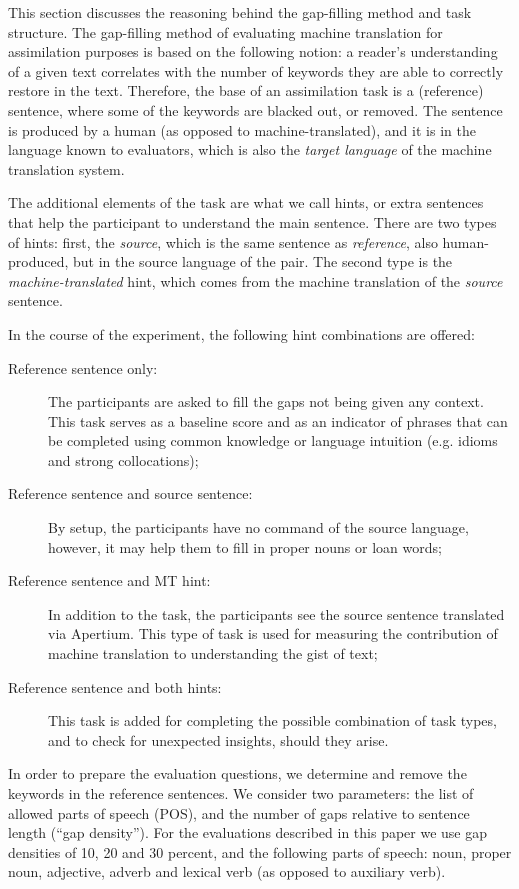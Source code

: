 \documentclass[11pt]{article}
\newcommand{\comment}[1]{\marginpar{\scriptsize\sf \textcolor{blue}{#1}}}
\begin{document}
This section discusses the reasoning behind the gap-filling method and task structure. The gap-filling method 
of evaluating machine translation for assimilation purposes is based on the following notion: a reader's understanding 
of a given text correlates with the number of keywords they are able to correctly restore in the text. Therefore, the 
base of an assimilation task is a (reference) sentence, where some of the keywords are blacked out, or removed. The sentence 
is produced by a human (as opposed to machine-translated), and it is in the language known to evaluators, which is also 
the \emph{target language} of the machine translation system.

The additional elements of the task are what we call hints, or extra sentences that help the participant to understand 
the main sentence. There are two types of hints: first, the \emph{source}, which is the same sentence as \emph{reference}, 
also human-produced, but in the source language of the pair. The second type is the \emph{machine-translated} hint, which 
comes from the machine translation of the \emph{source } sentence.

\comment{EA: I don't really have a good explanation why we used source+mt tasks, except for being exhaustive. could you suggest anything?}
In the course of the experiment, the following hint combinations are offered:
\begin{description}
\item[Reference sentence only:] The participants are asked to fill the gaps not being given
any context. This task serves as a baseline score and as an indicator of phrases
that can be completed using common knowledge or language intuition (e.g.
idioms and strong collocations);
\item[Reference sentence and source sentence:] By setup, the
participants have no command of the source language, however, it may help them to fill
in proper nouns or loan words;
\item[Reference sentence and MT hint:] In addition to the task, the
participants see the source sentence translated via Apertium. This type of task is
used for measuring the contribution of machine translation to understanding the
gist of text;
\item[Reference sentence and both hints:] This task is
added for completing the possible combination of task types, and to check
for unexpected insights, should they arise.
\end{description}

In order to prepare the evaluation questions, we determine and remove the keywords in the 
reference sentences. We consider two parameters: the list of allowed parts of speech (POS), and the 
number of gaps relative to sentence length (``gap density''). For the evaluations described in 
this paper we use gap densities of 10, 20 and 30 percent, and the following parts of speech: noun, 
proper noun, adjective, adverb and lexical verb (as opposed to auxiliary verb).
\end{document}
